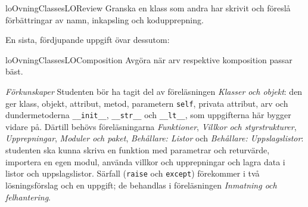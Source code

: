 \begin{restatable}{lo}{OvningClassesLOReview}%
  \label{OvningClassesLOReview}%
  Granska en klass som andra har skrivit och föreslå förbättringar av
  namn, inkapsling och kodupprepning.
\end{restatable}
En sista, fördjupande uppgift övar dessutom:
\begin{restatable}{lo}{OvningClassesLOComposition}%
  \label{OvningClassesLOComposition}%
  Avgöra när arv respektive komposition passar bäst.
\end{restatable}

\emph{Förkunskaper}
Studenten bör ha tagit del av föreläsningen \emph{Klasser och objekt}:
den ger klass, objekt, attribut, metod, parametern
\texttt{self}, privata attribut, arv och dundermetoderna
\texttt{__init__}, \texttt{__str__} och
\texttt{__lt__}, som uppgifterna här bygger vidare på.
Därtill behövs föreläsningarna \emph{Funktioner}, \emph{Villkor och
styrstrukturer}, \emph{Upprepningar}, \emph{Moduler och paket},
\emph{Behållare: Listor} och \emph{Behållare: Uppslagslistor}:
studenten ska kunna skriva en funktion med parametrar och returvärde,
importera en egen modul, använda villkor och upprepningar och lagra
data i listor och uppslagslistor.  Särfall
(\texttt{raise} och \texttt{except}) förekommer
i två lösningsförslag och en uppgift; de behandlas i föreläsningen
\emph{Inmatning och felhantering}.
